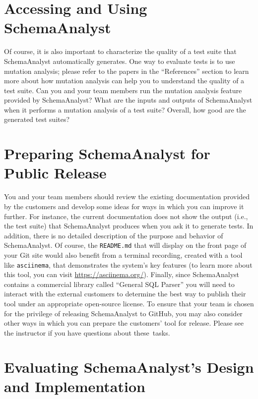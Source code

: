\section*{Accessing and Using SchemaAnalyst}



Of course, it is also important to characterize the quality of a test suite that SchemaAnalyst automatically generates.
One way to evaluate tests is to use mutation analysis; please refer to the papers in the ``References'' section to learn
more about how mutation analysis can help you to understand the quality of a test suite. Can you and your team members
run the mutation analysis feature provided by SchemaAnalyst? What are the inputs and outputs of SchemaAnalyst when it
performs a mutation analysis of a test suite? Overall, how good are the generated test suites?

\vspace*{-.05in}
\section*{Preparing SchemaAnalyst for Public Release}

You and your team members should review the existing documentation provided by the customers and develop some ideas for
ways in which you can improve it further. For instance, the current documentation does not show the output (i.e., the
test suite) that SchemaAnalyst produces when you ask it to generate tests. In addition, there is no detailed description
of the purpose and behavior of SchemaAnalyst. Of course, the {\tt README.md} that will display on the front page of your
Git site would also benefit from a terminal recording, created with a tool like {\tt asciinema}, that demonstrates the
system's key features (to learn more about this tool, you can visit \url{https://asciinema.org/}). Finally, since
SchemaAnalyst contains a commercial library called ``General SQL Parser'' you will need to interact with the external
customers to determine the best way to publish their tool under an appropriate open-source license. To ensure that your
team is chosen for the privilege of releasing SchemaAnalyst to GitHub, you may also consider other ways in
which you can prepare the customers' tool for release. Please see the instructor if you have questions about \mbox{these
tasks}.

\section*{Evaluating SchemaAnalyst's Design and Implementation}

